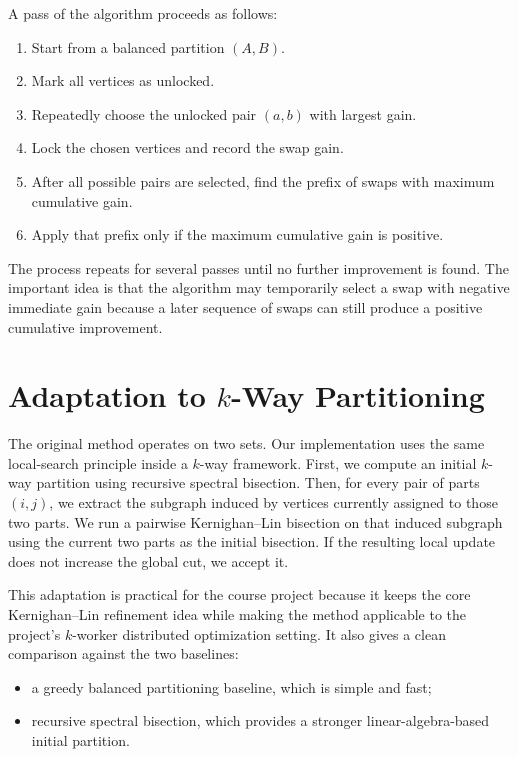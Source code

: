 \documentclass[11pt]{article}
\begin{document}
A pass of the algorithm proceeds as follows:
\begin{enumerate}
    \item Start from a balanced partition $(A,B)$.
    \item Mark all vertices as unlocked.
    \item Repeatedly choose the unlocked pair $(a,b)$ with largest gain.
    \item Lock the chosen vertices and record the swap gain.
    \item After all possible pairs are selected, find the prefix of swaps with
    maximum cumulative gain.
    \item Apply that prefix only if the maximum cumulative gain is positive.
\end{enumerate}

The process repeats for several passes until no further improvement is found.
The important idea is that the algorithm may temporarily select a swap with
negative immediate gain because a later sequence of swaps can still produce a
positive cumulative improvement.

\section{Adaptation to $k$-Way Partitioning}

The original method operates on two sets. Our implementation uses the same
local-search principle inside a $k$-way framework. First, we compute an initial
$k$-way partition using recursive spectral bisection. Then, for every pair of
parts $(i,j)$, we extract the subgraph induced by vertices currently assigned
to those two parts. We run a pairwise Kernighan--Lin bisection on that induced
subgraph using the current two parts as the initial bisection. If the resulting
local update does not increase the global cut, we accept it.

This adaptation is practical for the course project because it keeps the core
Kernighan--Lin refinement idea while making the method applicable to the
project's $k$-worker distributed optimization setting. It also gives a clean
comparison against the two baselines:
\begin{itemize}
    \item a greedy balanced partitioning baseline, which is simple and fast;
    \item recursive spectral bisection, which provides a stronger
    linear-algebra-based initial partition.
\end{itemize}
\end{document}
